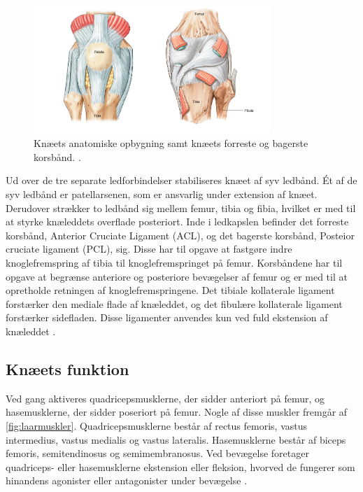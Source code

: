 \begin{figure}[H]
\centering
\includegraphics[width=0.8\textwidth]{figures/knae_anatomi}
\caption{Knæets anatomiske opbygning samt knæets forreste og bagerste korsbånd. \citep{aaos2014}.}
\label{fig:knae_anatomi}
\end{figure} 

\noindent
Ud over de tre separate ledforbindelser stabiliseres knæet af syv ledbånd. Ét af de syv ledbånd er patellarsenen, som er ansvarlig under extension af knæet. Derudover strækker to ledbånd sig mellem femur, tibia og fibia, hvilket er med til at styrke knæleddets overflade posteriort. 
Inde i ledkapslen befinder det forreste korsbånd, Anterior Cruciate Ligament (ACL), og det bagerste korsbånd, Posteior cruciate ligament (PCL), sig. Disse har til opgave at fastgøre indre knoglefremspring af tibia til knoglefremspringet på femur. 
Korsbåndene har til opgave at begrænse anteriore og posteriore bevægelser af femur og er med til at opretholde retningen af knoglefremspringene. 
Det tibiale kollaterale ligament forstærker den mediale flade af knæleddet, og det fibulære kollaterale ligament forstærker sidefladen. Disse ligamenter anvendes kun ved fuld ekstension af knæleddet \citep{martini2012}.

\subsection{Knæets funktion}
Ved gang aktiveres quadricepsmusklerne, der sidder anteriort på femur, og hasemusklerne, der sidder poseriort på femur. Nogle af disse muskler fremgår af \autoref{fig:laarmuskler}. Quadricepsmusklerne består af rectus femoris, vastus intermedius, vastus medialis og vastus lateralis. 
Hasemusklerne består af biceps femoris, semitendinosus og semimembranosus. 
Ved bevægelse foretager quadriceps- eller hasemusklerne ekstension eller fleksion, hvorved de fungerer som hinandens agonister eller antagonister under bevægelse \citep{martini2012}. 

